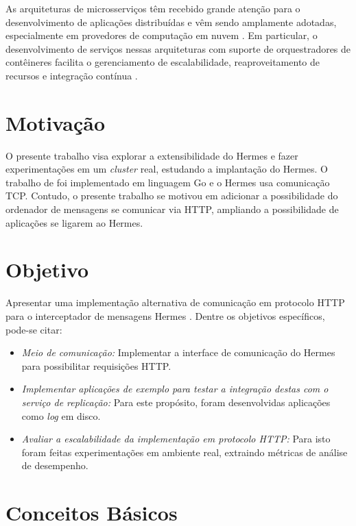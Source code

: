 \documentclass[12pt]{article}
\begin{document}
As arquiteturas de microsserviços têm recebido grande atenção para o desenvolvimento de aplicações distribuídas e vêm sendo amplamente adotadas, especialmente em provedores de computação em nuvem \cite{aguilera2020microsecond, netto2020incorporating, tai2016continuous, moghaddam2016simple, nguyen2020toward, gabbrielli2016self, toffetti2015architecture, oliveira2016evaluating}. Em particular, o desenvolvimento de serviços nessas arquiteturas com suporte de orquestradores de contêineres facilita o gerenciamento de escalabilidade, reaproveitamento de recursos e integração contínua \cite{ghofrani2018challenges}.

\section{Motivação}

O presente trabalho visa explorar a extensibilidade do Hermes e fazer experimentações em um 
\textit{cluster} real, estudando a implantação do Hermes. O trabalho de 
\cite{renan2021hermes} foi implementado em linguagem Go e o Hermes usa
comunicação TCP. Contudo, o presente trabalho se motivou em adicionar a
possibilidade do ordenador de mensagens se comunicar via HTTP, ampliando a possibilidade de aplicações se ligarem ao Hermes.

\section{Objetivo}
Apresentar uma implementação alternativa de comunicação em protocolo HTTP para o interceptador de mensagens Hermes \cite{renan2021hermes}.
Dentre os objetivos específicos, pode-se citar:
\begin{itemize}
\item \textit{Meio de comunicação:} Implementar a interface de comunicação do Hermes para possibilitar requisições HTTP.
\item \textit{Implementar aplicações de exemplo para testar a integração destas com o serviço de replicação:} Para este propósito, foram desenvolvidas aplicações como \textit{log} em disco.
\item \textit{Avaliar a escalabilidade da implementação em protocolo HTTP:}
Para isto foram feitas experimentações em ambiente real, extraindo métricas de análise de desempenho.
\end{itemize}

\section{Conceitos Básicos} \label{sec:cbas}
\end{document}
